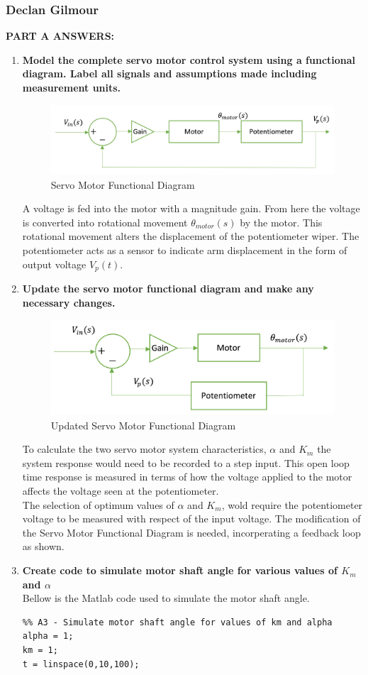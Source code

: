 \documentclass[11pt,a4paper]{article}
\begin{document}
\pagebreak
\subsubsection{Declan Gilmour}
\textbf{PART A ANSWERS:}
\begin{enumerate}
	\item \textbf{Model the complete servo motor control system using a functional diagram. Label all signals and assumptions made including measurement units.}
	\begin{figure}[H]
	\centering
	\includegraphics[width=.8\textwidth]{PreDec/A1.png}
	\caption{\label{fig:rand}Servo Motor Functional Diagram}
	\end{figure} 
	A voltage is fed into the motor with a magnitude gain. From here the voltage is converted into rotational movement $\theta_{motor}(s)$ by the motor.
	This rotational movement alters the displacement of the potentiometer wiper. The potentiometer acts as a sensor to indicate arm displacement in the form of output voltage $V_p(t)$.
	\item\textbf{Update the servo motor functional diagram and make any necessary changes.}
	\begin{figure}[H]
	\centering
	\includegraphics[width=.8\textwidth]{PreDec/A2.png}
	\caption{\label{fig:rand}Updated Servo Motor Functional Diagram}
	\end{figure}
	To calculate the two servo motor system characteristics, $\alpha$ and $K_m$ the system response would need to be recorded to a step input. This open loop time response is measured in terms of how the voltage applied to the motor affects the voltage seen at the potentiometer.\\
	The selection of optimum values of $\alpha$ and $K_m$, wold require the potentiometer voltage to be measured with respect of the input voltage. The modification of the Servo Motor Functional Diagram is needed, incorperating a feedback loop as shown.  
\pagebreak
	\item\textbf{Create code to simulate motor shaft angle for various values of $K_m$ and $\alpha$}\\
	Bellow is the Matlab code used to simulate the motor shaft angle.
	\begin{lstlisting}
%% A3 - Simulate motor shaft angle for values of km and alpha
alpha = 1;
km = 1;
t = linspace(0,10,100);


\end{lstlisting}
\end{enumerate}
\end{document}
